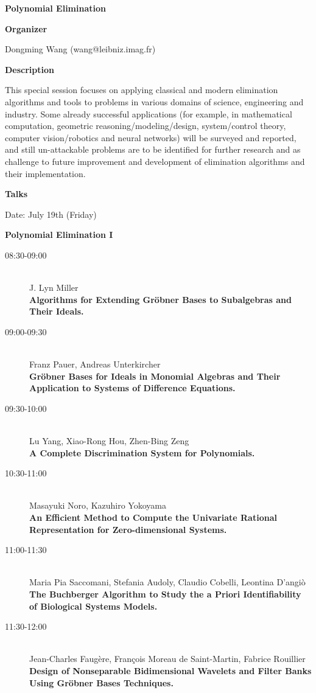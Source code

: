 \begin{center}
{\LARGE \bf Polynomial Elimination 
}
\end{center}
\bigskip

{\bf Organizer}
\medskip

Dongming Wang (wang@leibniz.imag.fr)

\bigskip

{\bf Description}
\medskip

This special session focuses on applying classical and modern elimination algorithms and tools to
problems in various domains of science, engineering and industry. Some already successful
applications (for example, in mathematical computation, geometric reasoning/modeling/design,
system/control theory, computer vision/robotics and neural networks) will be surveyed and
reported, and still un-attackable problems are to be identified for further research and as challenge
to future improvement and development of elimination algorithms and their implementation. 

\bigskip
{\bf Talks}
\medskip

Date: July 19th (Friday) 

\begin{center}
{\Large \bf Polynomial Elimination I
}
\end{center}


\begin{description}
\item[08:30-09:00] \ \\
  J. Lyn Miller\\
  {\bf Algorithms for Extending Gr\"obner Bases to Subalgebras and Their Ideals.
} 
\item[09:00-09:30] \ \\
  Franz Pauer, Andreas Unterkircher\\
  {\bf Gr\"obner Bases for Ideals in Monomial Algebras and Their Application to Systems of
    Difference Equations.} 
\item[09:30-10:00] \ \\
  Lu Yang, Xiao-Rong Hou, Zhen-Bing Zeng
\\
  {\bf A Complete Discrimination System for Polynomials.} 
\item[10:30-11:00] \ \\
  Masayuki Noro, Kazuhiro Yokoyama\\
  {\bf An Efficient Method to Compute the Univariate Rational Representation for
    Zero-dimensional Systems.} 
\item[11:00-11:30 ] \ \\
  Maria Pia Saccomani, Stefania Audoly, Claudio Cobelli, Leontina D'angi\`o
\\
  {\bf The Buchberger Algorithm to Study the a Priori Identifiability of Biological Systems
    Models.} 
\item[11:30-12:00] \ \\
  Jean-Charles Faug\`ere, Fran\c{c}ois Moreau de Saint-Martin, Fabrice Rouillier
\\
  {\bf Design of Nonseparable Bidimensional Wavelets and Filter Banks Using Gr\"obner Bases
    Techniques.} 

\end{description}


